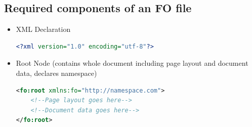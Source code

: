 \subsection{Required components of an FO file} 
\begin{itemize}
\item XML Declaration
\begin{lstlisting}[language=xml]
<?xml version="1.0" encoding="utf-8"?>
\end{lstlisting}


\item Root Node (contains whole document including page layout and document data, declares namespace)
\begin{lstlisting}[language=xml]
<fo:root xmlns:fo="http://namespace.com">
    <!--Page layout goes here-->
    <!--Document data goes here-->
</fo:root>
\end{lstlisting}


\end{itemize}
